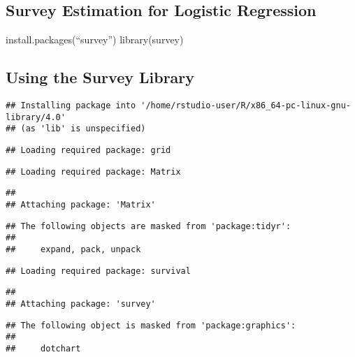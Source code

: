 \documentclass[
]{article}
\begin{document}
\hypertarget{survey-estimation-for-logistic-regression}{%
\subsection{Survey Estimation for Logistic
Regression}\label{survey-estimation-for-logistic-regression}}

install.packages(``survey'') library(survey)

\hypertarget{using-the-survey-library}{%
\subsection{Using the Survey Library}\label{using-the-survey-library}}

\begin{verbatim}
## Installing package into '/home/rstudio-user/R/x86_64-pc-linux-gnu-library/4.0'
## (as 'lib' is unspecified)
\end{verbatim}

\begin{verbatim}
## Loading required package: grid
\end{verbatim}

\begin{verbatim}
## Loading required package: Matrix
\end{verbatim}

\begin{verbatim}
## 
## Attaching package: 'Matrix'
\end{verbatim}

\begin{verbatim}
## The following objects are masked from 'package:tidyr':
## 
##     expand, pack, unpack
\end{verbatim}

\begin{verbatim}
## Loading required package: survival
\end{verbatim}

\begin{verbatim}
## 
## Attaching package: 'survey'
\end{verbatim}

\begin{verbatim}
## The following object is masked from 'package:graphics':
## 
##     dotchart
\end{verbatim}
\end{document}
